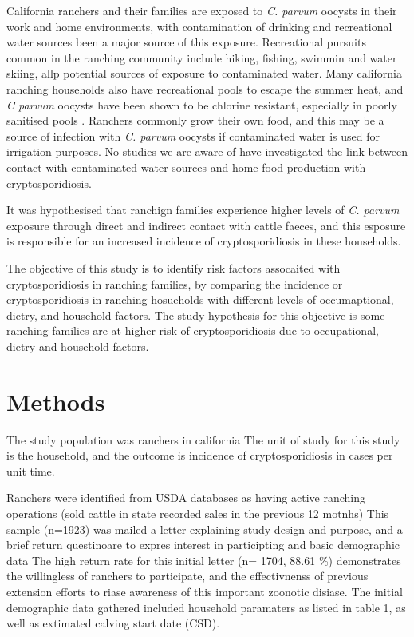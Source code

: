 \documentclass[12pt]{article}
\begin{document}
	California ranchers and their families are exposed to \emph{C. parvum} oocysts in their work and home environments, with contamination of drinking and recreational water sources been a major source of this exposure.
	Recreational pursuits common in the ranching community include hiking, fishing, swimmin and water skiing, allp potential sources of exposure to contaminated water. 
	Many california ranching households also have recreational pools to escape the summer heat, and \emph{C parvum} oocysts have been shown to be chlorine resistant, especially in poorly sanitised pools \cite{Carpenter1999}.
	Ranchers commonly grow their own food, and this may be a source of infection with \emph{C. parvum} oocysts if contaminated water is used for irrigation purposes.
	No studies we are aware of have investigated the link between contact with contaminated water sources and home food production with cryptosporidiosis. 


	It was hypothesised that ranchign families experience higher levels of \emph{C. parvum} exposure through direct and indirect contact with cattle faeces, and this esposure is responsible for an increased incidence of cryptosporidiosis in these households.

		
	The objective of this study is to identify risk factors assocaited with cryptosporidiosis in ranching families, by comparing the incidence or cryptosporidiosis in ranching hosueholds with different levels of occumaptional, dietry, and household factors.
	The study hypothesis for this objective is some ranching families are at higher risk of cryptosporidiosis due to occupational, dietry and household factors.


	\section{Methods} 
		The study population was ranchers in california 
	The unit of study for this study is the household, and the outcome is incidence of cryptosporidiosis in cases per unit time.


		Ranchers were identified from USDA databases as having active ranching operations (sold cattle in state recorded sales in the previous 12 motnhs)
		This sample (n=1923) was mailed a letter explaining study design and purpose, and a brief return questinoare to expres interest in participting and basic demographic data 
		The high return rate for this initial letter (n= 1704, 88.61 \%) demonstrates the willingless of ranchers to participate, and the effectivnenss of previous extension efforts to riase awareness of this important zoonotic disiase. 
		The initial demographic data gathered included household paramaters as listed in table 1, as well as extimated calving start date (CSD).
\end{document}

